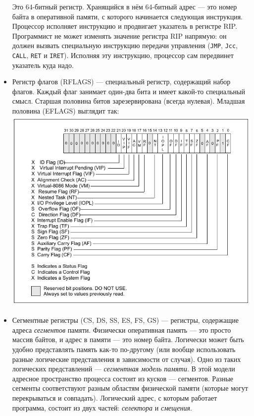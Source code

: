 \documentclass[11pt]{book}
\begin{document}
\begin{itemize}
Это 64-битный регистр. Хранящийся в нём 64-битный адрес --- это номер байта в оперативной памяти,
с которого начинается следующая инструкция. Процессор исполняет инструкцию и продвигает указатель в регистре RIP.
Программист не может изменять значение регистра RIP напрямую: он должен вызвать специальную инструкцию передачи управления
(\texttt{JMP}, \texttt{Jcc}, \texttt{CALL}, \texttt{RET} и \texttt{IRET}).
Исполняя эту инструкцию, процессор сам передвинет указатель куда надо.
\item Регистр флагов (RFLAGS) --- специальный регистр, содержащий набор флагов. Каждый флаг занимает один-два бита и имеет какой-то специальный смысл.
Старшая половина битов зарезервирована (всегда нулевая). Младшая половина (EFLAGS) выглядит так:
\\
\includegraphics[height=4in]{pic/eflags.png}
\\
\item Сегментные регистры (CS, DS, SS, ES, FS, GS) --- регистры, содержащие адреса \emph{сегментов} памяти.
Физически оперативная память --- это просто массив байтов, и адрес в памяти --- это номер байта.
Логически может быть удобно представлять память как-то по-другому (или вообще использовать разные логические представления в зависимости от случая).
Одно из таких логических представлений --- \emph{сегментная модель памяти}.
В этой модели адресное пространство процесса состоит из кусков --- сегментов.
Разные сегменты соответствуют разным областям физической памяти (которые могут перекрываться и совпадать).
Логический адрес, с которым работает программа, состоит из двух частей: \emph{селектора} и \emph{смещения}.

\end{itemize}
\end{document}
